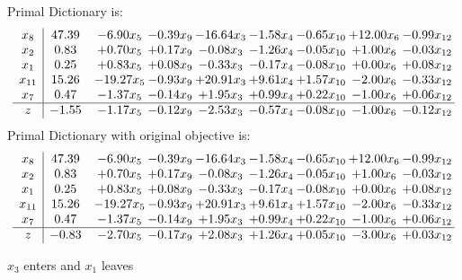 \documentclass[8pt]{article}
\begin{document}
Primal Dictionary is:
\[\begin{array}{c| c c@{\hskip 2pt} c@{\hskip 2pt} c@{\hskip 2pt} c@{\hskip 2pt} c@{\hskip 2pt} c@{\hskip 2pt} c@{\hskip 2pt} }
 x_{8}   &  47.39 & -6.90 x_{5} & -0.39 x_{9} & -16.64 x_{3} & -1.58 x_{4} & -0.65 x_{10} & + 12.00 x_{6} & -0.99 x_{12}\\
 x_{2}   &  0.83 & +  0.70 x_{5} & +  0.17 x_{9} & -0.08 x_{3} & -1.26 x_{4} & -0.05 x_{10} & +  1.00 x_{6} & -0.03 x_{12}\\
 x_{1}   &  0.25 & +  0.83 x_{5} & +  0.08 x_{9} & -0.33 x_{3} & -0.17 x_{4} & -0.08 x_{10} & +  0.00 x_{6} & +  0.08 x_{12}\\
 x_{11}   &  15.26 & -19.27 x_{5} & -0.93 x_{9} & + 20.91 x_{3} & +  9.61 x_{4} & +  1.57 x_{10} & -2.00 x_{6} & -0.33 x_{12}\\
 x_{7}   &  0.47 & -1.37 x_{5} & -0.14 x_{9} & +  1.95 x_{3} & +  0.99 x_{4} & +  0.22 x_{10} & -1.00 x_{6} & +  0.06 x_{12}\\
\hline
z    &  -1.55 & -1.17 x_{5} & -0.12 x_{9} & -2.53 x_{3} & -0.57 x_{4} & -0.08 x_{10} & -1.00 x_{6} & -0.12 x_{12}\\
\end{array}\]
Primal Dictionary with original objective is:
\[\begin{array}{c| c c@{\hskip 2pt} c@{\hskip 2pt} c@{\hskip 2pt} c@{\hskip 2pt} c@{\hskip 2pt} c@{\hskip 2pt} c@{\hskip 2pt} }
 x_{8}   &  47.39 & -6.90 x_{5} & -0.39 x_{9} & -16.64 x_{3} & -1.58 x_{4} & -0.65 x_{10} & + 12.00 x_{6} & -0.99 x_{12}\\
 x_{2}   &  0.83 & +  0.70 x_{5} & +  0.17 x_{9} & -0.08 x_{3} & -1.26 x_{4} & -0.05 x_{10} & +  1.00 x_{6} & -0.03 x_{12}\\
 x_{1}   &  0.25 & +  0.83 x_{5} & +  0.08 x_{9} & -0.33 x_{3} & -0.17 x_{4} & -0.08 x_{10} & +  0.00 x_{6} & +  0.08 x_{12}\\
 x_{11}   &  15.26 & -19.27 x_{5} & -0.93 x_{9} & + 20.91 x_{3} & +  9.61 x_{4} & +  1.57 x_{10} & -2.00 x_{6} & -0.33 x_{12}\\
 x_{7}   &  0.47 & -1.37 x_{5} & -0.14 x_{9} & +  1.95 x_{3} & +  0.99 x_{4} & +  0.22 x_{10} & -1.00 x_{6} & +  0.06 x_{12}\\
\hline
z    &  -0.83 & -2.70 x_{5} & -0.17 x_{9} & +  2.08 x_{3} & +  1.26 x_{4} & +  0.05 x_{10} & -3.00 x_{6} & +  0.03 x_{12}\\
\end{array}\]


 $ x_{3} $ enters and $ x_{1} $ leaves 
\end{document}
